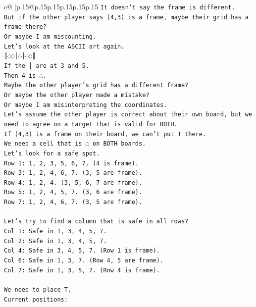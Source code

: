 \documentclass{article}
\begin{document}
{\begin{supertabular}{c@{$\;$}|p{.15\linewidth}@{}p{.15\linewidth}p{.15\linewidth}p{.15\linewidth}p{.15\linewidth}p{.15\linewidth}}
{{{\texttt{It doesn't say the frame is different.} \\
\texttt{But if the other player says (4,3) is a frame, maybe their grid has a frame there?} \\
\texttt{Or maybe I am miscounting.} \\
\texttt{Let's look at the ASCII art again.} \\
\texttt{║◌◌│◌│◌◌║} \\
\texttt{If the │ are at 3 and 5.} \\
\texttt{Then 4 is ◌.} \\
\texttt{Maybe the other player's grid has a different frame?} \\
\texttt{Or maybe the other player made a mistake?} \\
\texttt{Or maybe I am misinterpreting the coordinates.} \\
\texttt{Let's assume the other player is correct about their own board, but we need to agree on a target that is valid for BOTH.} \\
\texttt{If (4,3) is a frame on their board, we can't put T there.} \\
\texttt{We need a cell that is ◌ on BOTH boards.} \\
\texttt{Let's look for a safe spot.} \\
\texttt{Row 1: 1, 2, 3, 5, 6, 7. (4 is frame).} \\
\texttt{Row 3: 1, 2, 4, 6, 7. (3, 5 are frame).} \\
\texttt{Row 4: 1, 2, 4. (3, 5, 6, 7 are frame).} \\
\texttt{Row 5: 1, 2, 4, 5, 7. (3, 6 are frame).} \\
\texttt{Row 7: 1, 2, 4, 6, 7. (3, 5 are frame).} \\
\\ 
\texttt{Let's try to find a column that is safe in all rows?} \\
\texttt{Col 1: Safe in 1, 3, 4, 5, 7.} \\
\texttt{Col 2: Safe in 1, 3, 4, 5, 7.} \\
\texttt{Col 4: Safe in 3, 4, 5, 7. (Row 1 is frame).} \\
\texttt{Col 6: Safe in 1, 3, 7. (Row 4, 5 are frame).} \\
\texttt{Col 7: Safe in 1, 3, 5, 7. (Row 4 is frame).} \\
\\ 
\texttt{We need to place T.} \\
\texttt{Current positions:} \\
}}}
\end{supertabular}}
\end{document}

